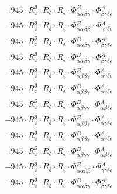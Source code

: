 \documentclass{article}
\begin{document}
\begin{subequations}
\begin{gather}
\begin{array}{c}
 \\[0.2em] 		 - 945 \cdot R_{z}^{6} \cdot R_{\delta{}} \cdot R_{\epsilon{}} \cdot \Phi{}^{B}_{\alpha{}\alpha{}\beta{}\gamma{}} \cdot \Phi{}^{A}_{\beta{}\gamma{}\delta{}\epsilon{}} 
 \\[0.2em] 		 - 945 \cdot R_{z}^{6} \cdot R_{\delta{}} \cdot R_{\epsilon{}} \cdot \Phi{}^{B}_{\alpha{}\alpha{}\beta{}\beta{}} \cdot \Phi{}^{A}_{\gamma{}\gamma{}\delta{}\epsilon{}} 
 \\[0.2em] 		 - 945 \cdot R_{z}^{6} \cdot R_{\delta{}} \cdot R_{\epsilon{}} \cdot \Phi{}^{B}_{\alpha{}\alpha{}\beta{}\gamma{}} \cdot \Phi{}^{A}_{\beta{}\gamma{}\delta{}\epsilon{}} 
 \\[0.2em] 		 - 945 \cdot R_{z}^{6} \cdot R_{\delta{}} \cdot R_{\epsilon{}} \cdot \Phi{}^{B}_{\alpha{}\alpha{}\beta{}\gamma{}} \cdot \Phi{}^{A}_{\beta{}\gamma{}\delta{}\epsilon{}} 
 \\[0.2em] 		 - 945 \cdot R_{z}^{6} \cdot R_{\delta{}} \cdot R_{\epsilon{}} \cdot \Phi{}^{B}_{\alpha{}\beta{}\beta{}\gamma{}} \cdot \Phi{}^{A}_{\alpha{}\gamma{}\delta{}\epsilon{}} 
 \\[0.2em] 		 - 945 \cdot R_{z}^{6} \cdot R_{\delta{}} \cdot R_{\epsilon{}} \cdot \Phi{}^{B}_{\alpha{}\beta{}\beta{}\gamma{}} \cdot \Phi{}^{A}_{\alpha{}\gamma{}\delta{}\epsilon{}} 
 \\[0.2em] 		 - 945 \cdot R_{z}^{6} \cdot R_{\delta{}} \cdot R_{\epsilon{}} \cdot \Phi{}^{B}_{\alpha{}\beta{}\gamma{}\gamma{}} \cdot \Phi{}^{A}_{\alpha{}\beta{}\delta{}\epsilon{}} 
 \\[0.2em] 		 - 945 \cdot R_{z}^{6} \cdot R_{\delta{}} \cdot R_{\epsilon{}} \cdot \Phi{}^{B}_{\alpha{}\beta{}\beta{}\gamma{}} \cdot \Phi{}^{A}_{\alpha{}\gamma{}\delta{}\epsilon{}} 
 \\[0.2em] 		 - 945 \cdot R_{z}^{6} \cdot R_{\delta{}} \cdot R_{\epsilon{}} \cdot \Phi{}^{B}_{\alpha{}\beta{}\beta{}\gamma{}} \cdot \Phi{}^{A}_{\alpha{}\gamma{}\delta{}\epsilon{}} 
 \\[0.2em] 		 - 945 \cdot R_{z}^{6} \cdot R_{\delta{}} \cdot R_{\epsilon{}} \cdot \Phi{}^{B}_{\alpha{}\beta{}\gamma{}\gamma{}} \cdot \Phi{}^{A}_{\alpha{}\beta{}\delta{}\epsilon{}} 
 \\[0.2em] 		 - 945 \cdot R_{z}^{6} \cdot R_{\delta{}} \cdot R_{\epsilon{}} \cdot \Phi{}^{B}_{\alpha{}\alpha{}\beta{}\beta{}} \cdot \Phi{}^{A}_{\gamma{}\gamma{}\delta{}\epsilon{}} 
 \\[0.2em] 		 - 945 \cdot R_{z}^{6} \cdot R_{\delta{}} \cdot R_{\epsilon{}} \cdot \Phi{}^{B}_{\alpha{}\alpha{}\beta{}\gamma{}} \cdot \Phi{}^{A}_{\beta{}\gamma{}\delta{}\epsilon{}} 

\end{array}
\end{gather}
\end{subequations}
\end{document}
